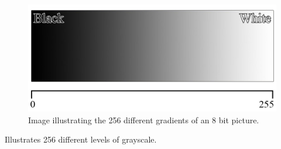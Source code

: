 \begin{figure}[htbp]
\centering
\includegraphics[width=1.00\textwidth]{Pictures/Theory/Grayscale.jpg}
\caption{Image illustrating the 256 different gradients of an 8 bit picture.}
\label{fig:ip_grayscale}
\end{figure}
 Illustrates 256 different levels of grayscale.\\

 
